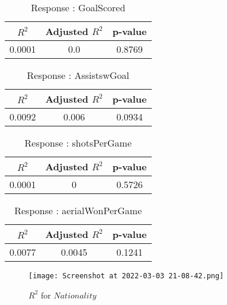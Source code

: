 \documentclass[12pt]{article}
\begin{document}
\begin{minipage}{0.5\textwidth}
	\begin{table}[H]
	\centering
	\caption{Response : GoalScored}\label{table:1a}
	{\begin{tabular}{|c|c|c|}
			\hline
			$ R^2 $ & Adjusted $ R^2 $ & p-value \\
			\hline
			0.0001 & 0.0 & 0.8769 \\
			\hline
		\end{tabular}
	}
\end{table}
\begin{table}[H]
	\centering
	\caption{Response : AssistswGoal}\label{table:1a}
	{\begin{tabular}{|c|c|c|}
			\hline
			$ R^2 $ & Adjusted $ R^2 $ & p-value \\
			\hline
			0.0092 & 0.006 & 0.0934 \\
			\hline
		\end{tabular}
	}
\end{table}
\end{minipage}
\hfill
\begin{minipage}{0.5\textwidth}
	\begin{table}[H]
	\centering
	\caption{Response : shotsPerGame }\label{table:1a}
	{\begin{tabular}{|c|c|c|}
			\hline
			$ R^2 $ & Adjusted $ R^2 $ & p-value \\
			\hline
			0.0001 & 0 & 0.5726 \\
			\hline
		\end{tabular}
	}
\end{table}
\begin{table}[H]
	\centering
	\caption{Response : aerialWonPerGame}\label{table:1a}
	{\begin{tabular}{|c|c|c|}
			\hline
			$ R^2 $ & Adjusted $ R^2 $ & p-value \\
			\hline
			0.0077 & 0.0045 & 0.1241 \\
			\hline
		\end{tabular}
	}
\end{table}
\end{minipage}


\begin{figure}[H]
	\centering
	\texttt{[image: Screenshot at 2022-03-03 21-08-42.png]}
	\caption{$ R^2 $ for $ Nationality $}
	\label{fig:1}
\end{figure}
\end{document}
